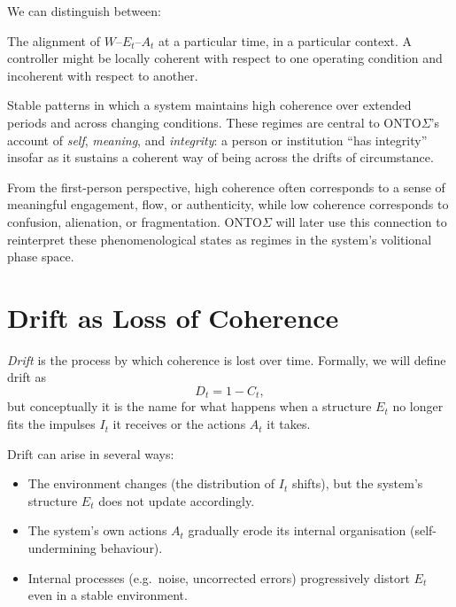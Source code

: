 \documentclass[12pt,a4paper]{report}
\newcommand{\Will}{W}
\newcommand{\Struct}{E}
\newcommand{\Act}{A}
\begin{document}
We can distinguish between:

\begin{description}[leftmargin=2em]
    \item[Local coherence.] The alignment of \(\Will\)–\(\Struct_t\)–\(\Act_t\) at a particular time, in a particular context. A controller might be locally coherent with respect to one operating condition and incoherent with respect to another.
    \item[Long-term coherence regimes.] Stable patterns in which a system maintains high coherence over extended periods and across changing conditions. These regimes are central to ONTO$\Sigma$'s account of \emph{self}, \emph{meaning}, and \emph{integrity}: a person or institution ``has integrity'' insofar as it sustains a coherent way of being across the drifts of circumstance.
\end{description}

From the first-person perspective, high coherence often corresponds to a sense of meaningful engagement, flow, or authenticity, while low coherence corresponds to confusion, alienation, or fragmentation. ONTO$\Sigma$ will later use this connection to reinterpret these phenomenological states as regimes in the system's volitional phase space.

\section{Drift as Loss of Coherence}

\emph{Drift} is the process by which coherence is lost over time. Formally, we will define drift as
\[
    D_t = 1 - C_t,
\]
but conceptually it is the name for what happens when a structure \(\Struct_t\) no longer fits the impulses \(I_t\) it receives or the actions \(\Act_t\) it takes.

Drift can arise in several ways:

\begin{itemize}[leftmargin=2em]
    \item The environment changes (the distribution of \(I_t\) shifts), but the system's structure \(\Struct_t\) does not update accordingly.
    \item The system's own actions \(\Act_t\) gradually erode its internal organisation (self-undermining behaviour).
    \item Internal processes (e.g.\ noise, uncorrected errors) progressively distort \(\Struct_t\) even in a stable environment.
\end{itemize}
\end{document}
